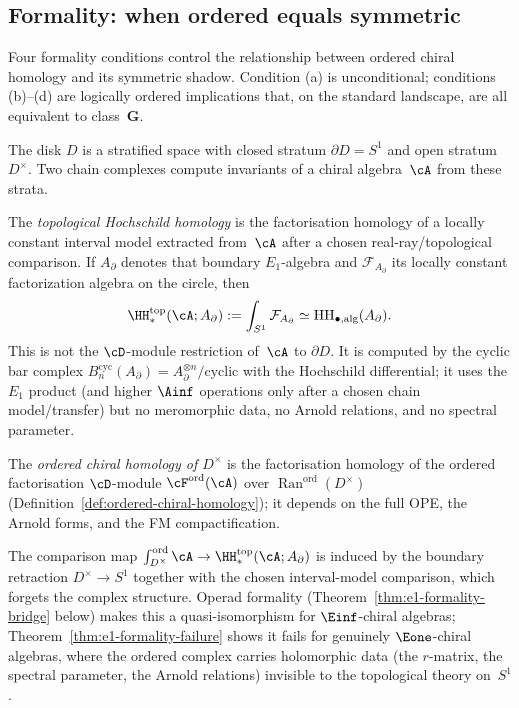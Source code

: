 
\subsection{Formality: when ordered equals symmetric}
\label{subsec:formality-bridge}

Four formality conditions control the relationship between
ordered chiral homology and its symmetric shadow.
Condition (a) is unconditional; conditions (b)--(d) are
logically ordered implications that, on the standard
landscape, are all equivalent to class~$\mathbf{G}$.

\begin{remark}
\label{rem:thh-vs-ord-ch}
The disk $D$ is a stratified space with closed stratum
$\partial D = S^1$ and open stratum $D^\times$. Two chain
complexes compute invariants of a chiral algebra~$\cA$
from these strata.

The \emph{topological Hochschild homology} is the
factorisation homology of a locally constant interval model extracted
from~$\cA$ after a chosen real-ray/topological comparison. If
$A_{\partial}$ denotes that boundary $E_1$-algebra and
$\mathcal F_{A_{\partial}}$ its locally constant factorization algebra
on the circle, then
\[
 \HH^{\mathrm{top}}_*(\cA;A_{\partial})
 := \int_{S^1} \mathcal F_{A_{\partial}}
 \simeq \mathrm{HH}_{\bullet,\mathrm{alg}}(A_{\partial}).
\]
This is not the $\cD$-module restriction of~$\cA$ to
$\partial D$. It is computed by the cyclic bar complex
$B^{\mathrm{cyc}}_n(A_{\partial})
= A_{\partial}^{\otimes n}/\text{cyclic}$
with the Hochschild differential; it uses the $E_1$ product
\textup{(}and higher $\Ainf$ operations only after a chosen chain
model/transfer\textup{)} but no meromorphic data, no Arnold
relations, and no spectral parameter.

The \emph{ordered chiral homology of $D^\times$} is the
factorisation homology of the ordered factorisation
$\cD$-module $\cF^{\mathrm{ord}}(\cA)$ over
$\operatorname{Ran}^{\mathrm{ord}}(D^\times)$
(Definition~\ref{def:ordered-chiral-homology}); it depends
on the full OPE, the Arnold forms, and the FM
compactification.

The comparison map
$\int_{D^\times}^{\mathrm{ord}} \cA \to
\HH^{\mathrm{top}}_*(\cA;A_{\partial})$ is induced by the boundary
retraction $D^\times \to S^1$ together with the chosen interval-model
comparison, which forgets the complex structure. Operad formality
(Theorem~\ref{thm:e1-formality-bridge} below) makes this a
quasi-isomorphism for $\Einf$-chiral algebras;
Theorem~\ref{thm:e1-formality-failure} shows it fails for
genuinely $\Eone$-chiral algebras, where the ordered complex
carries holomorphic data (the $r$-matrix, the spectral
parameter, the Arnold relations) invisible to the topological
theory on~$S^1$.
\end{remark}


